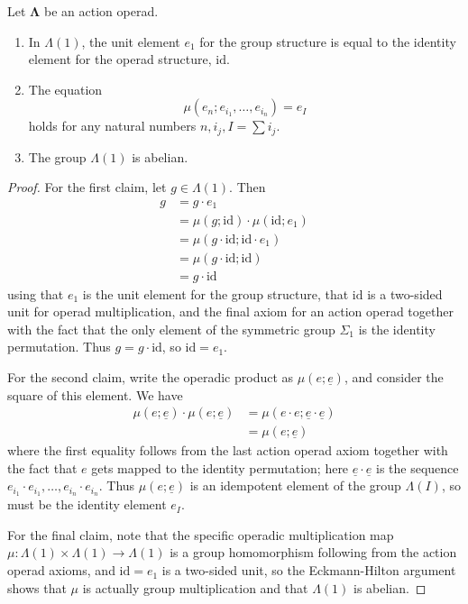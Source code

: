 \documentclass{amsbook} %
\newcommand{\id}{\textrm{id}}
\newcommand{\ML}{\mathbf{\Lambda}}
\numberwithin{section}{chapter}
\begin{document}
\begin{lem}\label{calclem}
Let $\ML$ be an action operad.
\begin{enumerate}
\item In $\Lambda(1)$, the unit element $e_{1}$ for the group structure is equal to the identity element for the operad structure, $\id$.
\item The equation
  \[
    \mu(e_{n}; e_{i_{1}}, \ldots, e_{i_{n}}) = e_{I}
  \]
holds for any natural numbers $n, i_{j}, I = \sum i_{j}$.
\item The group $\Lambda(1)$ is abelian.
\end{enumerate}
\end{lem}
\begin{proof}
For the first claim, let $g \in \Lambda(1)$.  Then
  \begin{align*}
    g & = g \cdot e_{1} \\
    &= \mu(g; \id) \cdot \mu(\id; e_{1}) \\
    &= \mu(g \cdot \id; \id \cdot e_{1}) \\
    &= \mu(g \cdot \id; \id) \\
    &= g \cdot \id
  \end{align*}
using that $e_{1}$ is the unit element for the group structure, that $\id$ is a two-sided unit for operad multiplication, and the final axiom for an action operad together with the fact that the only element of the symmetric group $\Sigma_{1}$ is the identity permutation.  Thus $g = g \cdot \id$, so $\id = e_{1}$.

For the second claim, write the operadic product as $\mu(e; \underline{e})$, and consider the square of this element. We have
  \begin{align*}
    \mu(e; \underline{e}) \cdot \mu(e; \underline{e}) & = \mu(e \cdot e; \underline{e} \cdot \underline{e}) \\
    &= \mu(e; \underline{e})
  \end{align*}
where the first equality follows from the last action operad axiom together with the fact that $e$ gets mapped to the identity permutation; here $\underline{e} \cdot \underline{e}$ is the sequence $e_{i_{1}} \cdot e_{i_{1}}, \ldots, e_{i_{n}} \cdot e_{i_{n}}$.  Thus $\mu(e; \underline{e})$ is an idempotent element of the group $\Lambda(I)$, so must be the identity element $e_{I}$.

For the final claim, note that the specific operadic multiplication map $\mu \colon \Lambda(1) \times \Lambda(1) \rightarrow \Lambda(1)$ is a group homomorphism following from the action operad axioms, and $\id = e_{1}$ is a two-sided unit, so the Eckmann-Hilton argument shows that $\mu$ is actually group multiplication and that $\Lambda(1)$ is abelian.
\end{proof}
\end{document}
